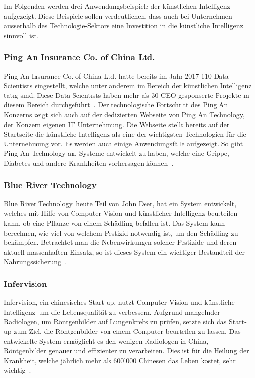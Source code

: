Im Folgenden werden drei Anwendungsbeispiele der künstlichen Intelligenz aufgezeigt. Diese Beispiele sollen verdeutlichen, dass auch bei Unternehmen ausserhalb des Technologie-Sektors eine Investition in die künstliche Intelligenz sinnvoll ist.

\subsubsection{Ping An Insurance Co. of China Ltd.}

Ping An Insurance Co. of China Ltd. hatte bereits im Jahr 2017 110 Data Scientists eingestellt, welche unter anderem im Bereich der künstlichen Intelligenz tätig sind. Diese Data Scientists haben mehr als 30 CEO gesponserte Projekte in diesem Bereich durchgeführt~\autocite{Ransbotham2017}. Der technologische Fortschritt des Ping An Konzerns zeigt sich auch auf der dedizierten Webseite von Ping An Technology, der Konzern eigenen IT Unternehmung. Die Webseite stellt bereits auf der Startseite die künstliche Intelligenz als eine der wichtigsten Technologien für die Unternehmung vor. Es werden auch einige Anwendungsfälle aufgezeigt. So gibt Ping An Technology an, Systeme entwickelt zu haben, welche eine Grippe, Diabetes und andere Krankheiten vorhersagen können~\autocite{PingAnTechnology}.

\subsubsection{Blue River Technology}


Blue River Technology, heute Teil von John Deer, hat ein System entwickelt, welches mit Hilfe von Computer Vision und künstlicher Intelligenz beurteilen kann, ob eine Pflanze von einem Schädling befallen ist. Das System kann berechnen, wie viel von welchem Pestizid notwendig ist, um den Schädling zu bekämpfen. Betrachtet man die Nebenwirkungen solcher Pestizide und deren aktuell massenhaften Einsatz, so ist dieses System ein wichtiger Bestandteil der Nahrungssicherung~\autocite{BlueRiverTechnology}.

\subsubsection{Infervision}

Infervision, ein chinesisches Start-up, nutzt Computer Vision und künstliche Intelligenz, um die Lebensqualität zu verbessern. Aufgrund mangelnder Radiologen, um Röntgenbilder auf Lungenkrebs zu prüfen, setzte sich das Start-up zum Ziel, die Röntgenbilder von einem Computer beurteilen zu lassen. Das entwickelte System ermöglicht es den wenigen Radiologen in China, Röntgenbilder genauer und effizienter zu verarbeiten. Dies ist für die Heilung der Krankheit, welche jährlich mehr als 600'000 Chinesen das Leben kostet, sehr wichtig~\autocite{Infervision}.




